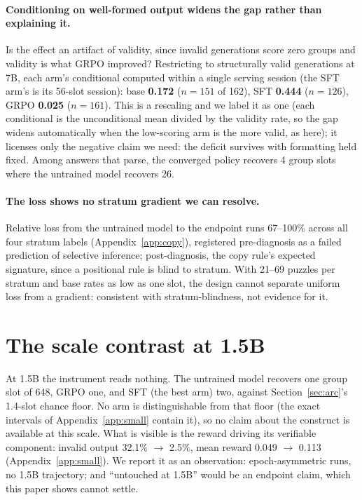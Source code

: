 \documentclass{article}
\begin{document}
\paragraph{Conditioning on well-formed output widens the gap rather than explaining it.} Is the effect an
artifact of validity, since invalid generations score zero groups and
validity is what GRPO improved? Restricting to
structurally valid generations at 7B, each arm's conditional computed within
a single serving session (the SFT arm's is its 56-slot session): base
\textbf{0.172} ($n=151$ of 162),
SFT \textbf{0.444} ($n=126$), GRPO \textbf{0.025} ($n=161$). This is a rescaling and we label it as one (each conditional is the unconditional mean divided by the validity rate, so the gap widens automatically when the low-scoring arm is the more valid, as here); it licenses only the negative claim we need: the deficit survives with formatting held fixed.
Among answers that parse, the converged policy recovers 4 group slots where
the untrained model recovers 26.

\paragraph{The loss shows no stratum gradient we can resolve.} Relative loss from the untrained model to the endpoint runs 67--100\% across all four stratum labels (Appendix~\ref{app:copy}), registered pre-diagnosis as a failed prediction of selective inference; post-diagnosis, the copy rule's expected signature, since a positional rule is blind to stratum. With 21--69 puzzles per stratum and base rates as low as one slot, the design cannot separate uniform loss from a gradient: consistent with stratum-blindness, not evidence for it.

\section{The scale contrast at 1.5B}
\label{sec:scale}

At 1.5B the instrument reads nothing. The untrained model recovers one
group slot of 648, GRPO one, and SFT (the best arm) two, against
Section~\ref{sec:arc}'s 1.4-slot chance floor. No arm is distinguishable
from that floor (the exact intervals of Appendix~\ref{app:small} contain it), so no
claim about the construct is available at this scale. What is visible is
the reward driving its verifiable component: invalid output 32.1\% $\to$
2.5\%, mean reward 0.049 $\to$ 0.113 (Appendix~\ref{app:small}). We report it as an observation: epoch-asymmetric runs, no 1.5B trajectory; and ``untouched at 1.5B'' would be an endpoint claim, which this paper shows cannot settle.
\end{document}
